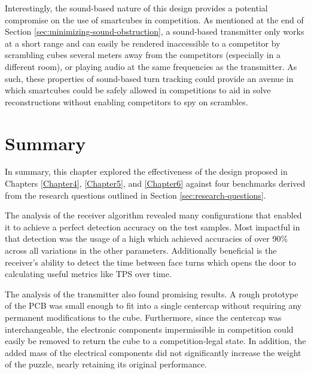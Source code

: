 Interestingly, the sound-based nature of this design provides a
potential compromise on the use of smartcubes in competition. As
mentioned at the end of Section \ref{sec:minimizing-sound-obstruction},
a sound-based transmitter only works at a short range and can easily be
rendered inaccessible to a competitor by scrambling cubes several
meters away from the competitors (especially in a different room), or
playing audio at the same frequencies as the transmitter. As such,
these properties of sound-based turn tracking could provide an avenue
in which smartcubes could be safely allowed in competitions to aid in
solve reconstructions without enabling competitors to spy on scrambles.

\section{Summary}

In summary, this chapter explored the effectiveness of the design
proposed in Chapters \ref{Chapter4}, \ref{Chapter5}, and \ref{Chapter6}
against four benchmarks derived from the research questions outlined in
Section \ref{sec:research-questions}.

The analysis of the receiver algorithm revealed many configurations
that enabled it to achieve a perfect detection accuracy on the test
samples. Most impactful in that detection was the usage of a high
 which achieved accuracies of over 90\% across all
variations in the other parameters. Additionally beneficial is the
receiver's ability to detect the time between face turns which opens
the door to calculating useful metrics like TPS over time.

The analysis of the transmitter also found promising results. A rough
prototype of the PCB was small enough to fit into a single centercap
without requiring any permanent modifications to the cube. Furthermore,
since the centercap was interchangeable, the electronic components
impermissible in competition could easily be removed to return the cube
to a competition-legal state. In addition, the added mass of the
electrical components did not significantly increase the weight of the
puzzle, nearly retaining its original performance.
